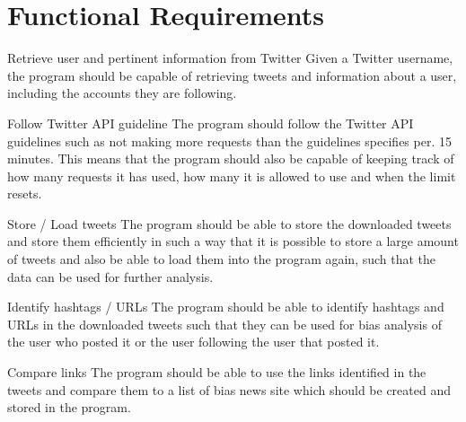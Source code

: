 \section{Functional Requirements}
\begin{requirement}{Retrieve user and pertinent information from Twitter}
Given a Twitter username, the program should be capable of retrieving tweets and
information about a user, including the accounts they are following.
\end{requirement}

\begin{requirement}{Follow Twitter \ac{API} guideline}
The program should follow the Twitter \ac{API} guidelines such as not making
more requests than the guidelines specifies per. 15 minutes. This means that the
program should also be capable of keeping track of how many requests it has
used, how many it is allowed to use and when the limit resets.
\end{requirement}

\begin{requirement}{Store / Load tweets}
The program should be able to store the downloaded tweets and store them
efficiently in such a way that it is possible to store a large amount of tweets
and also be able to load them into the program again, such that the data can be
used for further analysis.
\end{requirement}

\begin{requirement}{Identify hashtags / \acsp{URL}}
The program should be able to identify hashtags and \acp{URL} in the downloaded
tweets such that they can be used for bias analysis of the user who posted it or
the user following the user that posted it.
\end{requirement}

\begin{requirement}{Compare links}
The program should be able to use the links identified in the tweets and compare
them to a list of bias news site which should be created and stored in the
program. 
\end{requirement}

